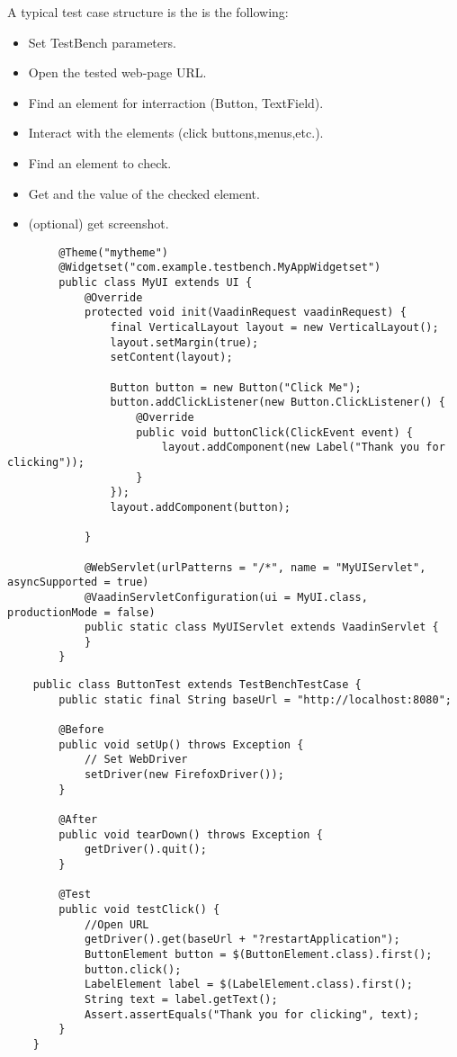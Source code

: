 A typical test case structure is the is the following:
\begin{itemize}
  \item Set TestBench parameters.
  \item Open the tested web-page URL.
  \item Find an element for interraction (Button, TextField).
  \item Interact with the elements (click buttons,menus,etc.).
  \item Find an element to check.
  \item Get and the value of the checked element.
  \item (optional) get screenshot.
\end{itemize}
	\lstset{language=Java}
	\begin{lstlisting}
		@Theme("mytheme")
		@Widgetset("com.example.testbench.MyAppWidgetset")
		public class MyUI extends UI {
		    @Override
		    protected void init(VaadinRequest vaadinRequest) {
		        final VerticalLayout layout = new VerticalLayout();
		        layout.setMargin(true);
		        setContent(layout);
		
		        Button button = new Button("Click Me");
		        button.addClickListener(new Button.ClickListener() {
		            @Override
		            public void buttonClick(ClickEvent event) {
		                layout.addComponent(new Label("Thank you for clicking"));
		            }
		        });
		        layout.addComponent(button);
		
		    }
		
		    @WebServlet(urlPatterns = "/*", name = "MyUIServlet", asyncSupported = true)
		    @VaadinServletConfiguration(ui = MyUI.class, productionMode = false)
		    public static class MyUIServlet extends VaadinServlet {
		    }
		}
	\end{lstlisting}
	\lstset{language=Java}
	\begin{lstlisting}
	public class ButtonTest extends TestBenchTestCase {
	    public static final String baseUrl = "http://localhost:8080";
	
	    @Before
	    public void setUp() throws Exception {
	        // Set WebDriver
	        setDriver(new FirefoxDriver());
	    }
	
	    @After
	    public void tearDown() throws Exception {
	        getDriver().quit();
	    }
	
	    @Test
	    public void testClick() {
	    	//Open URL
	        getDriver().get(baseUrl + "?restartApplication");
	        ButtonElement button = $(ButtonElement.class).first();
	        button.click();
	        LabelElement label = $(LabelElement.class).first();
	        String text = label.getText();
	        Assert.assertEquals("Thank you for clicking", text);
	    }
	}
	\end{lstlisting}
	
